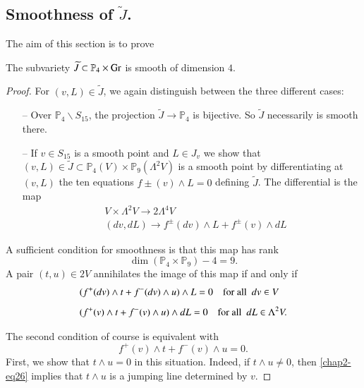 \subsection{Smoothness of \texorpdfstring{$\widetilde{J}$}{J}.}\label{chap2-sec5.3}

The aim of this section is to prove

\begin{proposition}\label{chap2-prop15}
The subvariety $\widetilde{J}\subset \mathbb{P}_{4}\times \operatorname{Gr}$ is
smooth of dimension $4$.
\end{proposition}

\begin{proof}
For $(v,L)\in \widetilde{J}$, we again distinguish between the three
different cases:
\begin{itemize}
\item[--] Over $\mathbb{P}_{4}\backslash S_{15}$, the projection
$\widetilde{J}\to \mathbb{P}_{4}$ is bijective. So $\widetilde{J}$
necessarily is smooth there.

\item[--] If $v\in S_{15}$ is a smooth point and $L\in J_{v}$ we show
that
$(v,L)\in \widetilde{J}\subset \mathbb{P}_{4}(V)\times \mathbb{P}_{9}(\Lambda^{2}V)$
is a smooth point by differentiating at $(v,L)$ the ten equations
$f\pm (v)\wedge L=0$ defining $\widetilde{J}$. The differential is the
map
\begin{align*}
& V\times \Lambda^{2}V\to 2\Lambda^{4}V\\[4pt]
& (dv,dL)\to f^{\pm}(dv)\wedge L+f^{\pm}(v)\wedge dL
\end{align*}\pageoriginale
\end{itemize}

A sufficient condition for smoothness is that this map has rank
$$
\dim (\mathbb{P}_{4}\times \mathbb{P}_{9})-4=9.
$$
A pair $(t,u)\in 2V$ annihilates the image of this map if and only if
\begin{align}
& (f^{+}(dv)\wedge t+f^{-}(dv)\wedge u)\wedge L=0\quad\text{for all}~~
dv\in V\label{chap2-eq25}\\[4pt]
& (f^{+}(v)\wedge t+f^{-}(v)\wedge u)\wedge dL=0\quad\text{for all}~~
dL\in \Lambda^{2}V.\notag
\end{align}

The second condition of course is equivalent with
\begin{equation}
f^{+}(v)\wedge t+f^{-}(v)\wedge u=0.\label{chap2-eq26}
\end{equation}
First, we show that $t\wedge u=0$ in this situation. Indeed, if
$t\wedge u\neq 0$, then \eqref{chap2-eq26} implies that $t\wedge u$ is
a jumping line determined by $v$.


\end{proof}
